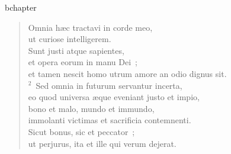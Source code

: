bchapter\begin{verse}\vspace{-19pt}Omnia h\ae c tractavi in corde meo,\\ ut curiose intelligerem.\\ Sunt justi atque sapientes,\\ et opera eorum in manu Dei~;\\ et tamen nescit homo utrum amore an odio dignus sit.\\
${}^{2}$~Sed omnia in futurum servantur incerta,\\ eo quod universa \ae que eveniant justo et impio,\\ bono et malo, mundo et immundo,\\ immolanti victimas et sacrificia contemnenti.\\ Sicut bonus, sic et peccator~;\\ ut perjurus, ita et ille qui verum dejerat.\end{verse}


